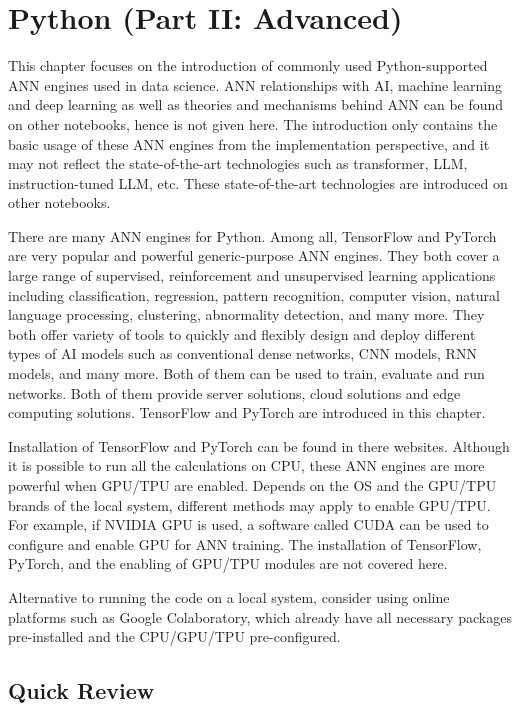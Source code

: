 \chapter{Python (Part II: Advanced)} \label{ch:tftorch}

This chapter focuses on the introduction of commonly used Python-supported ANN engines used in data science. ANN relationships with AI, machine learning and deep learning as well as theories and mechanisms behind ANN can be found on other notebooks, hence is not given here. The introduction only contains the basic usage of these ANN engines from the implementation perspective, and it may not reflect the state-of-the-art technologies such as transformer, LLM, instruction-tuned LLM, etc. These state-of-the-art technologies are introduced on other notebooks.

There are many ANN engines for Python. Among all, TensorFlow and PyTorch are very popular and powerful generic-purpose ANN engines. They both cover a large range of supervised, reinforcement and unsupervised learning applications including classification, regression, pattern recognition, computer vision, natural language processing, clustering, abnormality detection, and many more. They both offer variety of tools to quickly and flexibly design and deploy different types of AI models such as conventional dense networks, CNN models, RNN models, and many more. Both of them can be used to train, evaluate and run networks. Both of them provide server solutions, cloud solutions and edge computing solutions.  TensorFlow and PyTorch are introduced in this chapter.

Installation of TensorFlow and PyTorch can be found in there websites. Although it is possible to run all the calculations on CPU, these ANN engines are more powerful when GPU/TPU are enabled. Depends on the OS and the GPU/TPU brands of the local system, different methods may apply to enable GPU/TPU. For example, if NVIDIA GPU is used, a software called CUDA can be used to configure and enable GPU for ANN training. The installation of TensorFlow, PyTorch, and the enabling of GPU/TPU modules are not covered here.

Alternative to running the code on a local system, consider using online platforms such as Google Colaboratory, which already have all necessary packages pre-installed and the CPU/GPU/TPU pre-configured.

\section{Quick Review}

